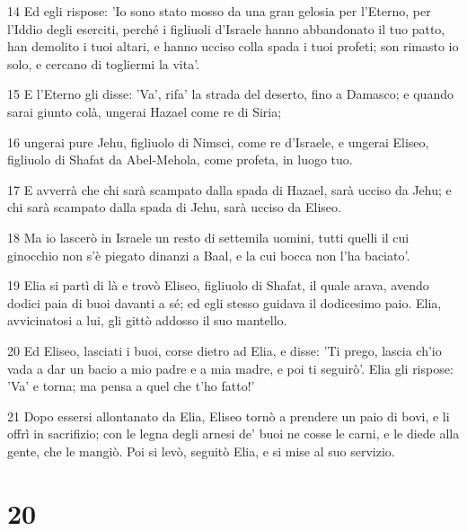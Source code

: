 \par 14 Ed egli rispose: 'Io sono stato mosso da una gran gelosia per l'Eterno, per l'Iddio degli eserciti, perché i figliuoli d'Israele hanno abbandonato il tuo patto, han demolito i tuoi altari, e hanno ucciso colla spada i tuoi profeti; son rimasto io solo, e cercano di togliermi la vita'.
\par 15 E l'Eterno gli disse: 'Va', rifa' la strada del deserto, fino a Damasco; e quando sarai giunto colà, ungerai Hazael come re di Siria;
\par 16 ungerai pure Jehu, figliuolo di Nimsci, come re d'Israele, e ungerai Eliseo, figliuolo di Shafat da Abel-Mehola, come profeta, in luogo tuo.
\par 17 E avverrà che chi sarà scampato dalla spada di Hazael, sarà ucciso da Jehu; e chi sarà scampato dalla spada di Jehu, sarà ucciso da Eliseo.
\par 18 Ma io lascerò in Israele un resto di settemila uomini, tutti quelli il cui ginocchio non s'è piegato dinanzi a Baal, e la cui bocca non l'ha baciato'.
\par 19 Elia si partì di là e trovò Eliseo, figliuolo di Shafat, il quale arava, avendo dodici paia di buoi davanti a sé; ed egli stesso guidava il dodicesimo paio. Elia, avvicinatosi a lui, gli gittò addosso il suo mantello.
\par 20 Ed Eliseo, lasciati i buoi, corse dietro ad Elia, e disse: 'Ti prego, lascia ch'io vada a dar un bacio a mio padre e a mia madre, e poi ti seguirò'. Elia gli rispose: 'Va' e torna; ma pensa a quel che t'ho fatto!'
\par 21 Dopo essersi allontanato da Elia, Eliseo tornò a prendere un paio di bovi, e li offrì in sacrifizio; con le legna degli arnesi de' buoi ne cosse le carni, e le diede alla gente, che le mangiò. Poi si levò, seguitò Elia, e si mise al suo servizio.

\chapter{20}

